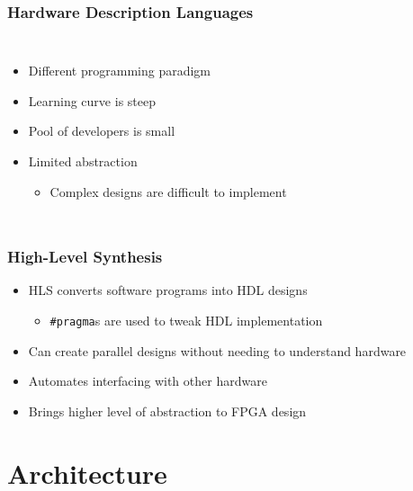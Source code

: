 \documentclass{beamer}
\begin{document}
\begin{frame}
	\frametitle{Hardware Description Languages}
	\begin{columns}
		\begin{itemize}
			\item Different programming paradigm
			\item Learning curve is steep
			\item Pool of developers is small
			\item Limited abstraction
			\begin{itemize}
				\item Complex designs are difficult to implement
				\autocite{honeycomb}
			\end{itemize}
		\end{itemize}
		
		
	\end{columns}
\end{frame}


\begin{frame}
	\frametitle{High-Level Synthesis}
	\begin{itemize}
		\item HLS converts software programs into HDL designs
		\begin{itemize}
			\item \texttt{\#pragma}s are used to tweak HDL implementation
		\end{itemize}
		\item Can create parallel designs without needing to understand hardware
		\item Automates interfacing with other hardware
		\item Brings higher level of abstraction to FPGA design
	\end{itemize}

	
\end{frame}


\section{Architecture}
\end{document}
